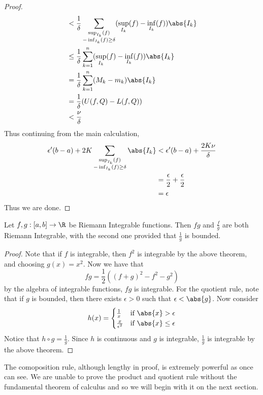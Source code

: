 \begin{thm}{}{}
\begin{proof}
\begin{align*}
&<\frac{1}{\delta}\sum_{\substack{\sup_{I_k}(f)\\-\inf_{I_k}(f)\geq\delta}}(\sup_{I_k}(f)-\inf_{I_k}(f))\abs{I_k}\\
&\leq\frac{1}{\delta}\sum_{k=1}^n(\sup_{I_k}(f)-\inf_{I_k}(f))\abs{I_k}\\
&=\frac{1}{\delta}\sum_{k=1}^n(M_k-m_k)\abs{I_k}\\
&=\frac{1}{\delta}(U(f,Q)-L(f,Q))\\
&<\frac{\nu}{\delta}
\end{align*}
Thus continuing from the main calculation, 
\begin{align*}
\epsilon'(b-a)+2K\sum_{\substack{\sup_{I_k}(f)\\-\inf_{I_k}(f)\geq\delta}}\abs{I_k}&<\epsilon'(b-a)+\frac{2K\nu}{\delta}\\
&=\frac{\epsilon}{2}+\frac{\epsilon}{2}\\
&=\epsilon
\end{align*}
Thus we are done. 
\end{proof}
\end{thm}

\begin{thm}{}{} Let $f,g:[a,b]\to\R$ be Riemann Integrable functions. Then $fg$ and $\frac{f}{g}$ are both Riemann Integrable, with the second one provided that $\frac{1}{g}$ is bounded. \tcbline
\begin{proof} Note that if $f$ is integrable, then $f^2$ is integrable by the above theorem, and choosing $g(x)=x^2$. Now we have that $$fg=\frac{1}{2}((f+g)^2-f^2-g^2)$$ by the algebra of integrable functions, $fg$ is integrable. For the quotient rule, note that if $g$ is bounded, then there exists $\epsilon>0$ such that $\epsilon<\abs{g}$. Now consider $$h(x)=\begin{cases}
\frac{1}{x} & \text{if $\abs{x}>\epsilon$}\\
\frac{x}{\epsilon^2} & \text{if $\abs{x}\leq\epsilon$}
\end{cases}$$
Notice that $h\circ g=\frac{1}{g}$. Since $h$ is continuous and $g$ is integrable, $\frac{1}{g}$ is integrable by the above theorem. 
\end{proof}
\end{thm}

The comoposition rule, although lengthy in proof, is extremely powerful as once can see. We are unable to prove the product and quotient rule without the fundamental theorem of calculus and so we will begin with it on the next section. 

